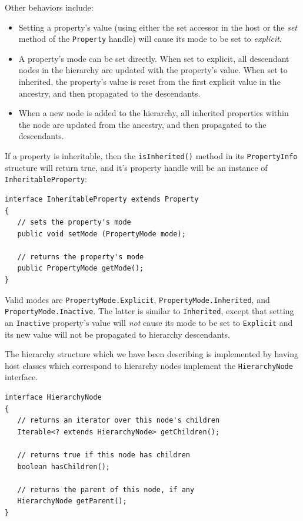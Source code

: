 \documentclass{article}
\begin{document}
Other behaviors include:

\begin{itemize}

\item Setting a property's value (using either the set accessor in the host
or the {\it set} method of the {\tt Property} handle) will cause its
mode to be set to {\it explicit}.

\item A property's mode can be set directly. When set to explicit, all
descendant nodes in the hierarchy are updated with the property's
value. When set to inherited, the property's value is reset from the
first explicit value in the ancestry, and then propagated to the
descendants.

\item When a new node is added to the hierarchy, all inherited properties
within the node are updated from the ancestry, and then propagated to
the descendants.

\end{itemize}

If a property is inheritable, then the {\tt isInherited()}
method in its {\tt PropertyInfo} structure will return true,
and it's property handle will be an instance of 
{\tt InheritableProperty}:
\begin{lstlisting}[]
interface InheritableProperty extends Property
{
   // sets the property's mode
   public void setMode (PropertyMode mode);

   // returns the property's mode
   public PropertyMode getMode();
}    
\end{lstlisting}
Valid modes are {\tt PropertyMode.Explicit}, 
{\tt PropertyMode.Inherited}, and {\tt PropertyMode.Inactive}. The latter
is similar to {\tt Inherited}, except that setting an {\tt Inactive}
property's value will {\it not} cause its mode to be set to 
{\tt Explicit} and its new value will not be propagated to hierarchy
descendants.

The hierarchy structure which we have been describing is implemented by
having host classes which correspond to hierarchy nodes implement the
{\tt HierarchyNode} interface.
\begin{lstlisting}[]
interface HierarchyNode 
{
   // returns an iterator over this node's children
   Iterable<? extends HierarchyNode> getChildren();

   // returns true if this node has children
   boolean hasChildren();
 
   // returns the parent of this node, if any
   HierarchyNode getParent();   
}    
\end{lstlisting}
\end{document}
